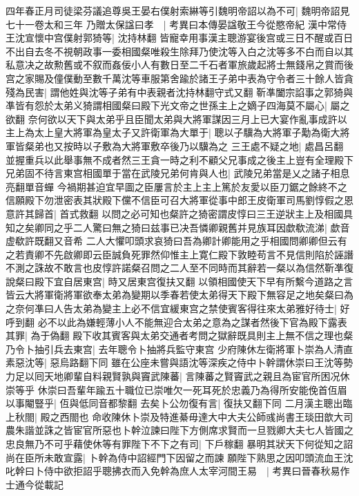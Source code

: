 四年春正月司徒梁芬議追尊吳王晏右僕射索綝等引魏明帝詔以為不可|{
	魏明帝詔見七十一卷太和三年}
乃贈太保諡曰孝　|{
	考異曰本傳晏諡敬王今從愍帝紀}
漢中常侍王沈宣懷中宫僕射郭猗等|{
	沈持林翻}
皆寵幸用事漢主聰游宴後宫或三日不醒或百日不出自去冬不視朝政事一委相國粲唯殺生除拜乃使沈等入白之沈等多不白而自以其私意决之故勲舊或不叙而姦佞小人有數日至二千石者軍旅歲起將士無錢帛之賞而後宫之家賜及僮僕動至數千萬沈等車服第舍踰於諸王子弟中表為守令者三十餘人皆貪殘為民害|{
	謂他姓與沈等子弟有中表親者沈持林翻守式又翻}
靳凖闔宗諂事之郭猗與凖皆有怨於太弟义猗謂相國粲曰殿下光文帝之世孫主上之嫡子四海莫不屬心|{
	屬之欲翻}
奈何欲以天下與太弟乎且臣聞太弟與大將軍謀因三月上已大宴作亂事成許以主上為太上皇大將軍為皇太子又許衛軍為大單于|{
	聰以子驥為大將軍子勱為衛大將軍皆粲弟也又按時以子敷為大將軍敷卒後乃以驥為之}
三王處不疑之地|{
	處昌呂翻}
並握重兵以此舉事無不成者然三王貪一時之利不顧父兄事成之後主上豈有全理殿下兄弟固不待言東宫相國單于當在武陵兄弟何肯與人也|{
	武陵兄弟當是乂之諸子相息亮翻單音蟬}
今禍期甚迫宜早圖之臣屢言於主上主上篤於友愛以臣刀鋸之餘終不之信願殿下勿泄密表其狀殿下儻不信臣可召大將軍從事中郎王皮衛軍司馬劉惇假之恩意許其歸首|{
	首式救翻}
以問之必可知也粲許之猗密謂皮惇曰三王逆狀主上及相國具知之矣卿同之乎二人驚曰無之猗曰兹事已决吾憐卿親舊并見族耳因歔欷流涕|{
	歔音虚欷許既翻又音希}
二人大懼叩頭求哀猗曰吾為卿計卿能用之乎相國問卿卿但云有之若責卿不先啟卿即云臣誠負死罪然仰惟主上寛仁殿下敦睦苟言不見信則陷於誣譖不測之誅故不敢言也皮惇許諾粲召問之二人至不同時而其辭若一粲以為信然靳凖復說粲曰殿下宜自居東宫|{
	時又居東宫復扶又翻}
以領相國使天下早有所繫今道路之言皆云大將軍衛將軍欲奉太弟為變期以季春若使太弟得天下殿下無容足之地矣粲曰為之奈何凖曰人告太弟為變主上必不信宜緩東宫之禁使賓客得往來太弟雅好待士|{
	好呼到翻}
必不以此為嫌輕薄小人不能無迎合太弟之意為之謀者然後下官為殿下露表其罪|{
	為于偽翻}
殿下收其賓客與太弟交通者考問之獄辭既具則主上無不信之理也粲乃令卜抽引兵去東宫|{
	去年聰令卜抽將兵監守東宫}
少府陳休左衛將軍卜崇為人清直素惡沈等|{
	惡烏路翻下同}
雖在公座未嘗與語沈等深疾之侍中卜幹謂休崇曰王沈等勢力足以囘天地卿輩自料親賢孰與竇武陳蕃|{
	言陳蕃之賢竇武之親且為宦官所困况休崇等乎}
休崇曰吾輩年踰五十職位已崇唯欠一死耳死於忠義乃為得所安能俛首仾眉以事閹豎乎|{
	仾與低同音都黎翻}
去矣卜公勿復有言|{
	復扶又翻下同}
二月漢主聰出臨上秋閤|{
	殿之西閤也}
命收陳休卜崇及特進綦毋達大中大夫公師彧尚書王琰田歆大司農朱諧並誅之皆宦官所惡也卜幹泣諫曰陛下方側席求賢而一旦戮卿大夫七人皆國之忠良無乃不可乎藉使休等有罪陛下不下之有司|{
	下戶稼翻}
暴明其狀天下何從知之詔尚在臣所未敢宣露|{
	卜幹為侍中詔經門下因留之而諫}
願陛下熟思之因叩頭流血王沈叱幹曰卜侍中欲拒詔乎聰拂衣而入免幹為庶人太宰河間王易　|{
	考異曰晉春秋易作士通今從載記}
